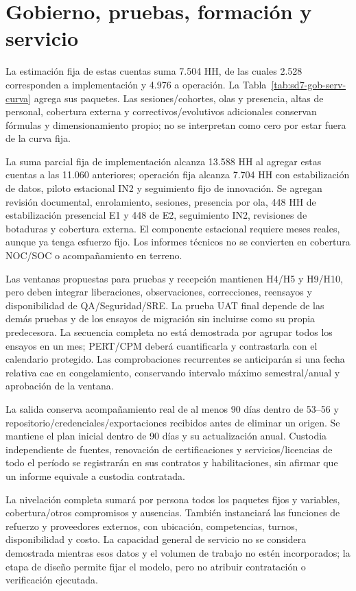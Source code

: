 \section{Gobierno, pruebas, formación y servicio}
La estimación fija de estas cuentas suma 7.504 HH, de las cuales 2.528 corresponden a implementación y 4.976 a operación. La Tabla~\ref{tab:sd7-gob-serv-curva} agrega sus paquetes. Las sesiones/cohortes, olas y presencia, altas de personal, cobertura externa y correctivos/evolutivos adicionales conservan fórmulas y dimensionamiento propio; no se interpretan como cero por estar fuera de la curva fija.


La suma parcial fija de implementación alcanza 13.588 HH al agregar estas cuentas a las 11.060 anteriores; operación fija alcanza 7.704 HH con estabilización de datos, piloto estacional IN2 y seguimiento fijo de innovación. Se agregan revisión documental, enrolamiento, sesiones, presencia por ola, 448 HH de estabilización presencial E1 y 448 de E2, seguimiento IN2, revisiones de botaduras y cobertura externa. El componente estacional requiere meses reales, aunque ya tenga esfuerzo fijo. Los informes técnicos no se convierten en cobertura NOC/SOC o acompañamiento en terreno.

Las ventanas propuestas para pruebas y recepción mantienen H4/H5 y H9/H10, pero deben integrar liberaciones, observaciones, correcciones, reensayos y disponibilidad de QA/Seguridad/SRE. La prueba UAT final depende de las demás pruebas y de los ensayos de migración sin incluirse como su propia predecesora. La secuencia completa no está demostrada por agrupar todos los ensayos en un mes; PERT/CPM deberá cuantificarla y contrastarla con el calendario protegido. Las comprobaciones recurrentes se anticiparán si una fecha relativa cae en congelamiento, conservando intervalo máximo semestral/anual y aprobación de la ventana.

La salida conserva acompañamiento real de al menos 90 días dentro de 53--56 y repositorio/credenciales/exportaciones recibidos antes de eliminar un origen. Se mantiene el plan inicial dentro de 90 días y su actualización anual. Custodia independiente de fuentes, renovación de certificaciones y servicios/licencias de todo el período se registrarán en sus contratos y habilitaciones, sin afirmar que un informe equivale a custodia contratada.

La nivelación completa sumará por persona todos los paquetes fijos y variables, cobertura/otros compromisos y ausencias. También instanciará las funciones de refuerzo y proveedores externos, con ubicación, competencias, turnos, disponibilidad y costo. La capacidad general de servicio no se considera demostrada mientras esos datos y el volumen de trabajo no estén incorporados; la etapa de diseño permite fijar el modelo, pero no atribuir contratación o verificación ejecutada.

